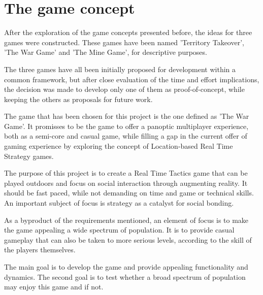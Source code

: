 \section{The game concept}

After the exploration of the game concepts presented before, the ideas for three
games were constructed. These games have been named 'Territory Takeover', 'The
War Game' and 'The Mine Game', for descriptive purposes.\newline 

The three games have all been initially proposed for development within a common
framework, but after close evaluation of the time and effort implications, the
decision was made to develop only one of them as proof-of-concept, while keeping
the others as proposals for future work.\newline

The game that has been chosen for this project is the one defined as 'The War
Game'. It promisses to be the game to offer a panoptic multiplayer experience,
both as a semi-core and casual game, while filling a gap in the current offer of
gaming experience by exploring the concept of Location-based Real Time Strategy
games. \newline

The purpose of this project is to create a Real Time Tactics game that can be
played outdoors and focus on social interaction through augmenting reality. It
should be fast paced, while not demanding on time and game or technical skills.
An important subject of focus is strategy as a catalyst for social
bonding.\newline

As a byproduct of the requirements mentioned, an element of focus is to make the
game appealing a wide spectrum of population. It is to provide casual gameplay
that can also be taken to more serious levels, according to the skill of the
players themselves.\newline

The main goal is to develop the game and provide appealing functionality and
dynamics. The second goal is to test whether a broad spectrum of population may
enjoy this game and if not. \newline


